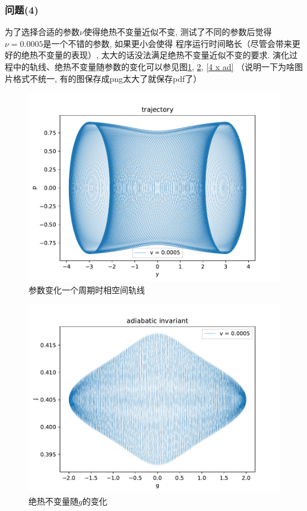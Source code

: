 \documentclass[a4paper,zihao=5,UTF8]{ctexart}
\begin{document}
    \subsubsection{问题(4)}
    为了选择合适的参数$\nu$使得绝热不变量近似不变, 测试了不同的参数后觉得$\nu=0.0005$是一个不错的参数, 如果更小会使得
    程序运行时间略长（尽管会带来更好的绝热不变量的表现）, 太大的话没法满足绝热不变量近似不变的要求.
    演化过程中的轨线、绝热不变量随参数的变化可以参见图\ref{4 traj}, \ref{4 g ad}, \ref{4 x ad}
    （说明一下为啥图片格式不统一, 有的图保存成png太大了就保存pdf了）
    \begin{figure}[htbp]
        \centering
        \includegraphics[scale=0.6]{4_traj_v=0_0005.pdf}
        \caption{参数变化一个周期时相空间轨线}
        \label{4 traj}
    \end{figure}
    \begin{figure}[htbp]
        \centering
        \includegraphics[scale=0.6]{4g_ad_invr_v=0_0005.pdf}
        \caption{绝热不变量随$g$的变化}
        \label{4 g ad}
    \end{figure}
\end{document}
